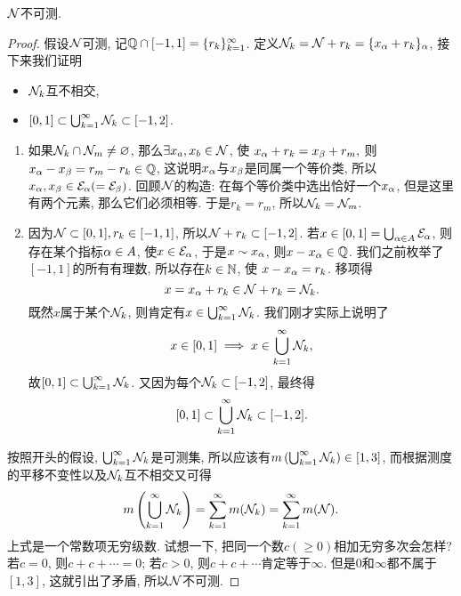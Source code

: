 \begin{theorem}\label{nonmeasurable}
    $\mathcal{N}$不可测.
\end{theorem}
\begin{proof}
    假设$\mathcal{N}$可测, 记$\mathbb{Q} \cap [-1,1]=\{r_k\}_{k=1}^\infty$.
    定义$\mathcal{N}_k = \mathcal{N} + r_k = \{x_\alpha + r_k\}_\alpha$, 接下来我们证明
    \begin{itemize}
    \item $\mathcal{N}_k$互不相交, 
    \item $[0,1] \subset \bigcup_{k=1}^{\infty}\mathcal{N}_k \subset [-1,2]$. 
    \end{itemize}
    \begin{enumerate}
    \item 如果$\mathcal{N}_k \cap \mathcal{N}_m \neq \varnothing$, 
    那么$\exists x_a, x_b \in \mathcal{N}$, 使
    $x_\alpha + r_k = x_\beta + r_m,$
    则$x_\alpha-x_\beta = r_m - r_k \in \mathbb{Q}$, 这说明$x_\alpha$与$x_\beta$是同属一个等价类, 所以$x_\alpha, x_\beta \in \mathcal{E}_\alpha (=\mathcal{E}_\beta)$. 
    回顾$\mathcal{N}$的构造: 在每个等价类中选出恰好一个$x_\alpha$, 但是这里有两个元素, 那么它们必须相等. 于是$r_k=r_m$, 所以$\mathcal{N}_k = \mathcal{N}_m$. 
    \item 因为$\mathcal{N} \subset [0,1], r_k \in [-1,1]$, 所以$\mathcal{N}+r_k \subset [-1,2]$. 
    若$x \in [0,1] = \bigcup_{\alpha \in A}\mathcal{E}_\alpha$, 则存在某个指标$\alpha \in A$, 使$x \in \mathcal{E}_\alpha$, 于是$x \sim x_\alpha$, 则$x-x_\alpha \in \mathbb{Q}$. 我们之前枚举了$[-1,1]$的所有有理数, 所以存在$k \in \mathbb{N}$, 使
    $x-x_\alpha = r_k$. 移项得
    $$x = x_\alpha + r_k \in \mathcal{N} + r_k = \mathcal{N}_k.$$ 
    既然$x$属于某个$\mathcal{N}_k$, 则肯定有$x \in \bigcup_{k=1}^{\infty}\mathcal{N}_k$. 我们刚才实际上说明了
    $$x \in [0,1] \implies x \in \bigcup_{k=1}^{\infty}\mathcal{N}_k,$$
    故$[0,1] \subset \bigcup_{k=1}^{\infty}\mathcal{N}_k$.
    又因为每个$\mathcal{N}_k \subset [-1,2]$, 最终得
    $$[0,1] \subset \bigcup_{k=1}^{\infty}\mathcal{N}_k \subset [-1,2].$$
    \end{enumerate}
    按照开头的假设, $\bigcup_{k=1}^{\infty}\mathcal{N}_k$是可测集, 所以应该有$m\left(\bigcup_{k=1}^{\infty}\mathcal{N}_k\right) \in [1,3]$, 而根据测度的平移不变性以及$\mathcal{N}_k$互不相交又可得
    $$m\left(\bigcup_{k=1}^{\infty}\mathcal{N}_k\right)
    = \sum_{k=1}^{\infty}m(\mathcal{N}_k) = \sum_{k=1}^{\infty}m(\mathcal{N}).$$
    上式是一个常数项无穷级数. 试想一下, 把同一个数$c(\geq 0)$相加无穷多次会怎样? 若$c=0$, 则$c+c+\cdots = 0$; 若$c>0$, 则$c+c+\cdots$肯定等于$\infty$. 但是$0$和$\infty$都不属于$[1,3]$, 这就引出了矛盾, 所以$\mathcal{N}$不可测. 
\end{proof}

